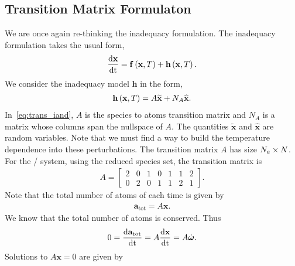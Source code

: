 \subsection{Transition Matrix Formulaton}
We are once again re-thinking the inadequacy formulation.  The inadequacy 
formulation takes the usual form,
\begin{align}
  \frac{\mathrm{d} \mathbf{x}}{\mathrm{d} \mathrm{t}} = \mathbf{f}\left(\mathbf{x}, T\right) + \mathbf{h}\left(\mathbf{x}, T\right).
\end{align}
We consider the inadequacy model $\mathbf{h}$ in the form,
\begin{align}
  \mathbf{h}\left(\mathbf{x}, T\right) = A\widetilde{\mathbf{x}} + N_{A}\widehat{\mathbf{x}}.
  \label{eq:trans_inad}
\end{align}
In~\eqref{eq:trans_iand}, $A$ is the species to atoms transition matrix and 
$N_{A}$ is a matrix whose columns span the nullspace of $A$.  The quantities 
$\widetilde{\mathbf{x}}$ and $\widehat{\mathbf{x}}$ are random variables. 
Note that we must find a way to build the temperature dependence into 
these perturbations.  The transition matrix $A$ has size $N_{a}\times N$. 
For the / system, using the reduced species set, the 
transition matrix is
\begin{align}
  A = 
  \begin{bmatrix}
    2 & 0 & 1 & 0 & 1 & 1 & 2 \\
    0 & 2 & 0 & 1 & 1 & 2 & 1
  \end{bmatrix}.
\end{align}
Note that the total number of atoms of each time is given by 
\begin{align}
  \mathbf{a}_{\textrm{tot}} = A\mathbf{x}.
\end{align}
We know that the total number of atoms is conserved.
Thus
\begin{align}
  0 = \frac{\mathrm{d} \mathbf{a}_{\textrm{tot}}}{\mathrm{d} \mathrm{t}} = 
  A \frac{\mathrm{d} \mathbf{x}}{\mathrm{d} \mathrm{t}} = A\dot{\boldsymbol{\omega}}.
\end{align}
Solutions to $A\mathbf{x} = 0$ are given by 
